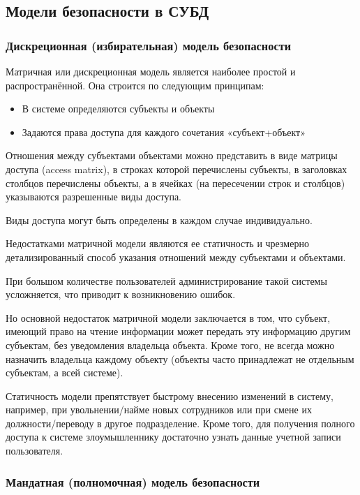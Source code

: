 \subsection{Модели безопасности в СУБД}
\subsubsection{Дискреционная (избирательная) модель безопасности}
Матричная или дискреционная модель является наиболее простой и распространённой. Она строится по следующим принципам:
\begin{itemize}
	\item В системе определяются субъекты и объекты
	\item Задаются права доступа для каждого сочетания «субъект+объект»
\end{itemize}
Отношения между субъектами объектами можно представить в виде матрицы доступа (access matrix), в строках которой перечислены субъекты, в заголовках столбцов перечислены объекты, а в ячейках (на пересечении строк и столбцов) указываются разрешенные виды доступа.

Виды доступа могут быть определены в каждом случае индивидуально.

Недостатками матричной модели являются ее статичность и чрезмерно детализированный способ указания отношений между субъектами и объектами.

При большом количестве пользователей администрирование такой системы усложняется, что приводит к возникновению ошибок.

Но основной недостаток матричной модели заключается в том, что субъект, имеющий право на чтение информации может передать эту информацию другим субъектам, без уведомления владельца объекта. Кроме того, не всегда можно назначить владельца каждому объекту (объекты часто принадлежат не отдельным субъектам, а всей системе).

Статичность модели препятствует быстрому внесению изменений в систему, например, при увольнении/найме новых сотрудников или при смене их должности/переводу в другое подразделение.
Кроме того, для получения полного доступа к системе злоумышленнику достаточно узнать данные учетной записи пользователя. 

\subsubsection{Мандатная (полномочная) модель безопасности}

